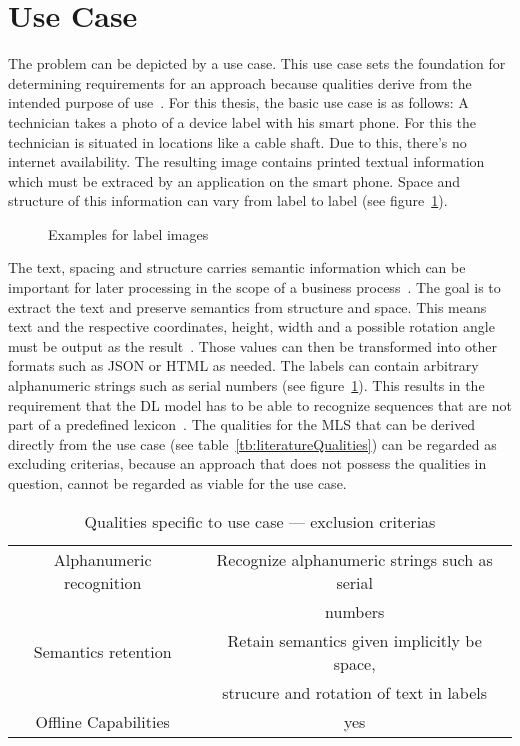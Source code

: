 \section{Use Case}
The problem can be depicted by a use case.
This use case sets the foundation for determining requirements for an
approach because qualities derive from the intended purpose of
use~\citep{siebert_construction_2021}.
For this thesis, the basic use case is as follows:
A technician takes a photo of a device label with his smart phone.
For this the technician is situated in locations like a cable shaft.
Due to this, there's no internet availability.
The resulting image contains printed textual information which must be extraced by an application on
the smart phone.
Space and structure of this information can vary from label to label (see figure~\ref{fig:examples}).
\begin{figure}[h]
    \centering
    \caption{Examples for label images\label{fig:examples}}
\end{figure}
The text, spacing and structure carries semantic information which can be important for later
processing in the scope of a business process~\citep{chen_text_2021}.
The goal is to extract the text and preserve semantics from structure and space.
This means text and the respective coordinates, height, width and a possible rotation angle must
be output as the result~\citep{yang_learning_2021}.
Those values can then be transformed into other formats such as JSON or HTML as needed.
The labels can contain arbitrary alphanumeric strings such as serial numbers (see
figure~\ref{fig:examples}).
This results in the requirement that the \ac{DL} model has to be able to recognize sequences that
are not part of a predefined lexicon~\citep{ghosh_visual_2017}.
The qualities for the \ac{MLS} that can be derived directly from the use case (see
table~\ref{tb:literatureQualities}) can be regarded as excluding criterias, because an approach
that does not possess the qualities in question, cannot be regarded as viable for the use case.
\begin{table}[h]
    \centering
    \begin{tabular}{c|c}
        Alphanumeric recognition    & Recognize alphanumeric strings such as serial \\
                                    & numbers \\
        Semantics retention & Retain semantics given implicitly be space, \\
                            & strucure and rotation of text in labels \\
        Offline Capabilities & yes
    \end{tabular}
    \caption{Qualities specific to use case --- exclusion criterias}
\end{table}

